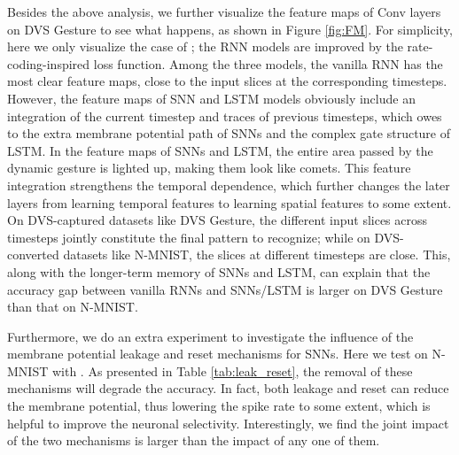 \documentclass[journal,10pt,twocolumn]{IEEETran}
\begin{document}
Besides the above analysis, we further visualize the feature maps of Conv layers on DVS Gesture to see what happens, as shown in Figure \ref{fig:FM}. For simplicity, here we only visualize the case of ; the RNN models are improved by the rate-coding-inspired loss function. Among the three models, the vanilla RNN has the most clear feature maps, close to the input slices at the corresponding timesteps. However, the feature maps of SNN and LSTM models obviously include an integration of the current timestep and traces of previous timesteps, which owes to the extra membrane potential path of SNNs and the complex gate structure of LSTM. In the feature maps of SNNs and LSTM, the entire area passed by the dynamic gesture is lighted up, making them look like comets. This feature integration strengthens the temporal dependence, which further changes the later layers from learning temporal features to learning spatial features to some extent. On DVS-captured datasets like DVS Gesture, the different input slices across timesteps jointly constitute the final pattern to recognize; while on DVS-converted datasets like N-MNIST, the slices at different timesteps are close. This, along with the longer-term memory of SNNs and LSTM, can explain that the accuracy gap between vanilla RNNs and SNNs/LSTM is larger on DVS Gesture than that on N-MNIST.

\begin{table}[!htbp]
\caption{Influence of membrane potential leakage and reset. }
\label{tab:leak_reset}
\vspace{2pt}
\centering
\renewcommand\arraystretch{1.3}
\end{table}


Furthermore, we do an extra experiment to investigate the influence of the membrane potential leakage and reset mechanisms for SNNs. Here we test on N-MNIST with . As presented in Table \ref{tab:leak_reset}, the removal of these mechanisms will degrade the accuracy. In fact, both leakage and reset can reduce the membrane potential, thus lowering the spike rate to some extent, which is helpful to improve the neuronal selectivity. Interestingly, we find the joint impact of the two mechanisms is larger than the impact of any one of them.
\end{document}
